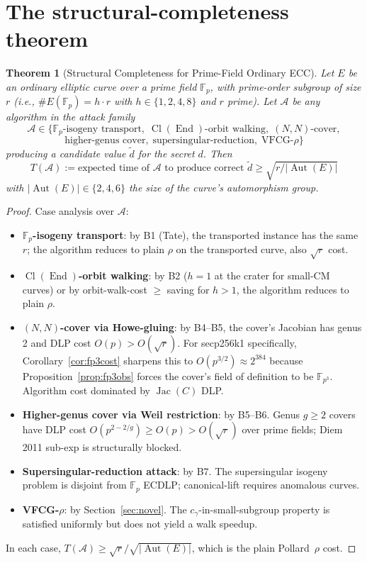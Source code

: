 \documentclass[11pt,a4paper]{article}
\newtheorem{theorem}{Theorem}[section]
\theoremstyle{definition}
\newcommand{\FF}{\mathbb{F}}
\newcommand{\End}{\operatorname{End}}
\newcommand{\Aut}{\operatorname{Aut}}
\newcommand{\Cl}{\operatorname{Cl}}
\newcommand{\Jac}{\operatorname{Jac}}
\begin{document}
\section{The structural-completeness theorem}\label{sec:theorem}

\begin{theorem}[Structural Completeness for Prime-Field Ordinary ECC]
\label{thm:main}
Let $E$ be an ordinary elliptic curve over a prime field $\FF_p$,
with prime-order subgroup of size $r$ (i.e., $\#E(\FF_p) = h \cdot r$
with $h \in \{1, 2, 4, 8\}$ and $r$ prime). Let $\mathcal{A}$ be any
algorithm in the attack family
\[
   \mathcal{A} \in \{\text{$\FF_p$-isogeny transport},\;
                    \Cl(\End)\text{-orbit walking},\;
                    (N,N)\text{-cover},
\]\[
                    \text{higher-genus cover},\;
                    \text{supersingular-reduction},\;
                    \text{VFCG-}\rho\}
\]
producing a candidate value $\tilde d$ for the secret $d$. Then
\[
   T(\mathcal{A}) := \text{expected time of $\mathcal{A}$ to produce
                          correct $\tilde d$}
   \geq \sqrt{r / |\Aut(E)|}
\]
with $|\Aut(E)| \in \{2, 4, 6\}$ the size of the curve's
automorphism group.
\end{theorem}

\begin{proof}
Case analysis over $\mathcal{A}$:
\begin{itemize}
\item \textbf{$\FF_p$-isogeny transport}: by B1 (Tate), the
      transported instance has the same $r$; the algorithm reduces
      to plain $\rho$ on the transported curve, also $\sqrt{r}$ cost.
\item \textbf{$\Cl(\End)$-orbit walking}: by B2 ($h = 1$ at the
      crater for small-CM curves) or by orbit-walk-cost $\geq$ saving
      for $h > 1$, the algorithm reduces to plain $\rho$.
\item \textbf{$(N, N)$-cover via Howe-gluing}: by B4--B5, the
      cover's Jacobian has genus 2 and DLP cost
      $O(p) > O(\sqrt{r})$. For secp256k1 specifically,
      Corollary~\ref{cor:fp3cost} sharpens this to $O(p^{3/2})
      \approx 2^{384}$ because Proposition~\ref{prop:fp3obs}
      forces the cover's field of definition to be $\FF_{p^3}$.
      Algorithm cost dominated by $\Jac(C)$ DLP.
\item \textbf{Higher-genus cover via Weil restriction}: by B5--B6.
      Genus $g \geq 2$ covers have DLP cost
      $O(p^{2 - 2/g}) \geq O(p) > O(\sqrt{r})$ over prime fields;
      Diem 2011 sub-exp is structurally blocked.
\item \textbf{Supersingular-reduction attack}: by B7. The
      supersingular isogeny problem is disjoint from $\FF_p$ ECDLP;
      canonical-lift requires anomalous curves.
\item \textbf{VFCG-$\rho$}: by Section~\ref{sec:novel}. The
      $c_\gamma$-in-small-subgroup property is satisfied uniformly
      but does not yield a walk speedup.
\end{itemize}
In each case, $T(\mathcal{A}) \geq \sqrt{r}/\sqrt{|\Aut(E)|}$, which
is the plain Pollard~$\rho$ cost.
\end{proof}
\end{document}
